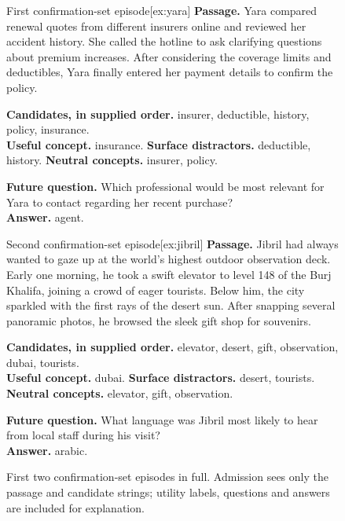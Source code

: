 \begin{figure}[t]
\centering
\begin{minipage}[t]{0.485\textwidth}
\begin{sdabox}[example]{First confirmation-set episode}[ex:yara]
\textbf{Passage.} Yara compared renewal quotes from different insurers
online and reviewed her accident history. She called the hotline to ask
clarifying questions about premium increases. After considering the
coverage limits and deductibles, Yara finally entered her payment
details to confirm the policy.

\medskip
\textbf{Candidates, in supplied order.} insurer, deductible, history,
policy, insurance.\\
\textbf{Useful concept.} insurance. \textbf{Surface distractors.}
deductible, history. \textbf{Neutral concepts.} insurer, policy.

\medskip
\textbf{Future question.} Which professional would be most relevant for
Yara to contact regarding her recent purchase?\\
\textbf{Answer.} agent.
\end{sdabox}
\end{minipage}\hfill
\begin{minipage}[t]{0.485\textwidth}
\begin{sdabox}[example]{Second confirmation-set episode}[ex:jibril]
\textbf{Passage.} Jibril had always wanted to gaze up at the world's
highest outdoor observation deck. Early one morning, he took a swift
elevator to level 148 of the Burj Khalifa, joining a crowd of eager
tourists. Below him, the city sparkled with the first rays of the desert
sun. After snapping several panoramic photos, he browsed the sleek gift
shop for souvenirs.

\medskip
\textbf{Candidates, in supplied order.} elevator, desert, gift,
observation, dubai, tourists.\\
\textbf{Useful concept.} dubai. \textbf{Surface distractors.} desert,
tourists. \textbf{Neutral concepts.} elevator, gift, observation.

\medskip
\textbf{Future question.} What language was Jibril most likely to hear
from local staff during his visit?\\
\textbf{Answer.} arabic.
\end{sdabox}
\end{minipage}
\caption{First two confirmation-set episodes in full. Admission sees only
the passage and candidate strings; utility labels, questions and answers
are included for explanation.}
\label{fig:examples}
\end{figure}


